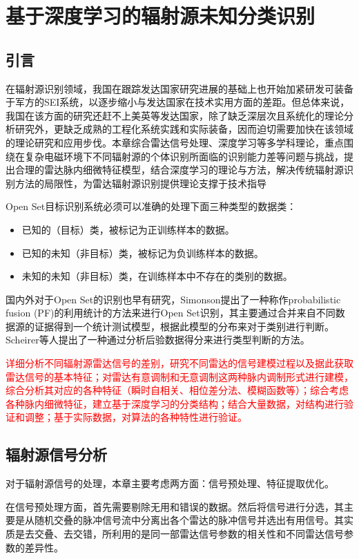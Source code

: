 \chapter{基于深度学习的辐射源未知分类识别}
\section{引言}
在辐射源识别领域，我国在跟踪发达国家研究进展的基础上也开始加紧研发可装备于军方的SEI系统，以逐步缩小与发达国家在技术实用方面的差距。但总体来说，我国在该方面的研究还赶不上美英等发达国家，除了缺乏深层次且系统化的理论分析研究外，更缺乏成熟的工程化系统实践和实际装备，因而迫切需要加快在该领域的理论研究和应用步伐。本章综合雷达信号处理、深度学习等多学科理论，重点围绕在复杂电磁环境下不同辐射源的个体识别所面临的识别能力差等问题与挑战，提出合理的雷达脉内细微特征模型，结合深度学习的理论与方法，解决传统辐射源识别方法的局限性，为雷达辐射源识别提供理论支撑于技术指导

Open Set目标识别系统必须可以准确的处理下面三种类型的数据类：
\begin{itemize}
	\item 已知的（目标）类，被标记为正训练样本的数据。
	\item 已知的未知（非目标）类，被标记为负训练样本的数据。
	\item 未知的未知（非目标）类，在训练样本中不存在的类别的数据。
\end{itemize}
国内外对于Open Set的识别也早有研究，Simonson\cite{simonson1998probabilistic}提出了一种称作probabilistic fusion (PF)的利用统计的方法来进行Open Set识别，其主要通过合并来自不同数据源的证据得到一个统计测试模型，根据此模型的分布来对于类别进行判断。Scheirer等人\cite{scheirer2011meta}提出了一种通过分析后验数据得分来进行类型判断的方法。

\textcolor{red}{详细分析不同辐射源雷达信号的差别，研究不同雷达的信号建模过程以及据此获取雷达信号的基本特征；对雷达有意调制和无意调制这两种脉内调制形式进行建模，综合分析其对应的各种特征（瞬时自相关、相位差分法、模糊函数等）；综合考虑各种脉内细微特征，建立基于深度学习的分类结构；结合大量数据，对结构进行验证和调整；基于实际数据，对算法的各种特性进行验证。}

\section{辐射源信号分析}

对于辐射源信号的处理，本章主要考虑两方面：信号预处理、特征提取优化。

在信号预处理方面，首先需要剔除无用和错误的数据。然后将信号进行分选，其主要是从随机交叠的脉冲信号流中分离出各个雷达的脉冲信号并选出有用信号。其实质是去交叠、去交错，所利用的是同一部雷达信号参数的相关性和不同雷达信号参数的差异性。


